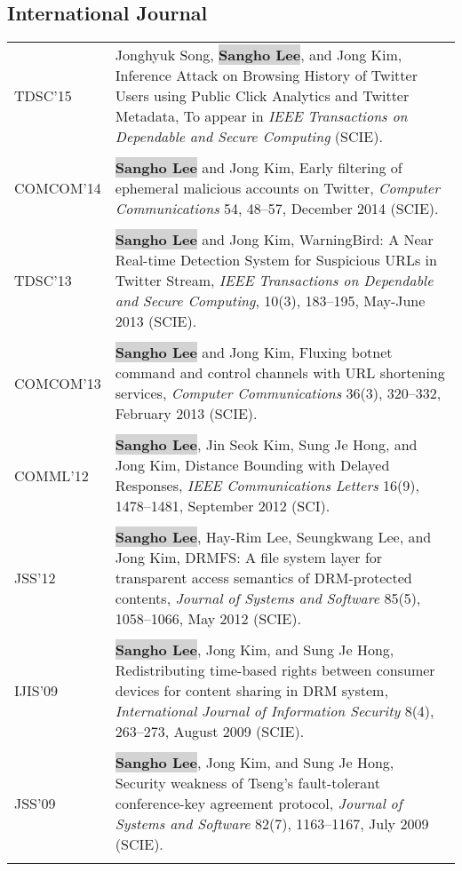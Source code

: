 \documentclass[letterpaper]{article}
\def\name{Sangho Lee}
\newcommand{\myname}{\colorbox{lightgray}{\textbf{\name}}\xspace}
\begin{document}
\subsection*{International Journal}
\begin{longtable}{@{}p{0.8in}p{5.4in}@{}}
  TDSC'15 & Jonghyuk Song, \myname, and Jong Kim, Inference Attack on Browsing History of Twitter Users using Public Click Analytics and Twitter Metadata, To appear in {\it IEEE Transactions on Dependable and Secure Computing} (SCIE).\\\\
  COMCOM'14 & \myname and Jong Kim, Early filtering of ephemeral malicious accounts on Twitter, 
  {\it Computer Communications} 54, 48--57, December 2014 (SCIE).\\\\
  TDSC'13 & \myname and Jong Kim, WarningBird: A Near Real-time Detection System for Suspicious URLs in Twitter Stream, {\it IEEE Transactions on Dependable and Secure Computing}, 10(3), 183--195, May-June 2013 (SCIE).\\\\
  COMCOM'13 & \myname and Jong Kim, Fluxing botnet command and control channels with URL shortening services, {\it Computer Communications} 36(3), 320--332, February 2013 (SCIE).\\\\
  COMML'12 & \myname, Jin Seok Kim, Sung Je Hong, and Jong Kim, Distance Bounding with Delayed Responses, {\it IEEE Communications Letters} 16(9), 1478--1481, September 2012 (SCI).\\\\
  JSS'12 & \myname, Hay-Rim Lee, Seungkwang Lee, and Jong Kim, DRMFS: A file system layer for transparent access semantics of DRM-protected contents, {\it Journal of Systems and Software} 85(5), 1058--1066, May 2012 (SCIE).\\\\
  IJIS'09 & \myname, Jong Kim, and Sung Je Hong, Redistributing time-based rights between consumer devices for content sharing in DRM system, {\it International Journal of Information Security} 8(4), 263--273, August 2009 (SCIE).\\\\
  JSS'09 & \myname, Jong Kim, and Sung Je Hong,  Security weakness of Tseng's fault-tolerant conference-key agreement protocol, {\it Journal of Systems and Software} 82(7), 1163--1167, July 2009 (SCIE).\\\\
\end{longtable}
\end{document}
